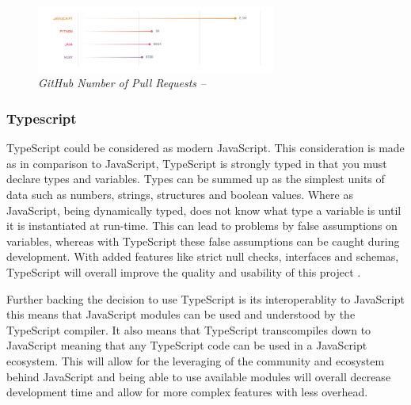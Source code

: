 \begin{figure}[!h]
\centering
\includegraphics*[width=0.7\textwidth]{images/a4.png}
\caption{\em GitHub Number of Pull Requests --  \cite{octoverse_2017_2018}}
\label{img:js2}
\end{figure}


\newpage
\subsubsection{Typescript}
\label{sub:typescript}
TypeScript could be considered as modern JavaScript. This consideration is made as in comparison to JavaScript, TypeScript is strongly typed in that you must declare types and variables. Types can be summed up as the simplest units of data such as numbers, strings, structures and boolean values. Where as JavaScript, being dynamically typed, does not know what type a variable is until it is instantiated at run-time. This can lead to problems by false assumptions on variables, whereas with TypeScript these false assumptions can be caught during development. With added features like strict null checks, interfaces and schemas, TypeScript will overall improve the quality and usability of this project \citep{typescript}.

Further backing the decision to use TypeScript is its interoperablity to JavaScript this means that JavaScript modules can be used and understood by the TypeScript compiler. It also means that TypeScript transcompiles down to JavaScript meaning that any TypeScript code can be used in a JavaScript ecosystem. This will allow for the leveraging of the community and ecosystem behind JavaScript and being able to use available modules will overall decrease development time and allow for more complex features with less overhead.

